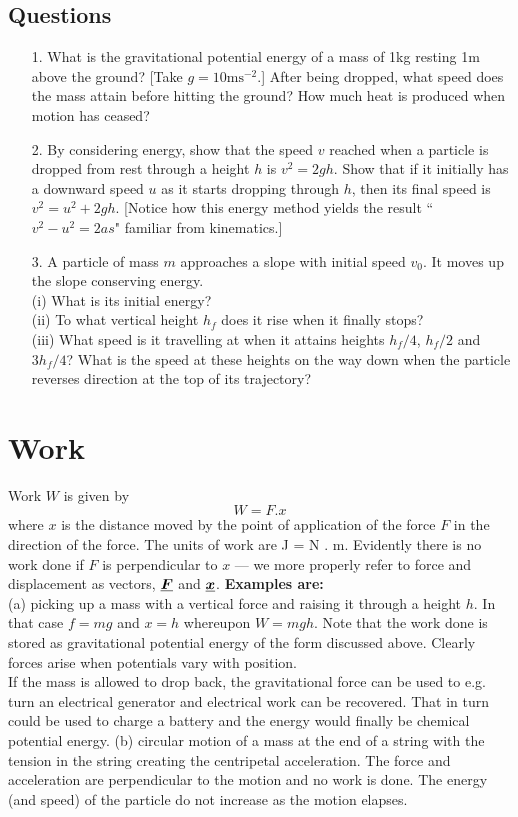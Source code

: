 \subsection*{Questions}
\begin{itemize}
\item[1.] What is the gravitational potential energy of a mass of 1kg resting 1m above the ground? [Take $g= 10\textrm{ms}^{-2}$.]  After being dropped, what speed does the mass attain before hitting the ground?  How much heat is produced when motion has ceased?
\item[2.] By considering energy, show that the speed $v$ reached when a particle is dropped from rest through a height $h$ is $v^2 = 2 g h$.  Show that if it initially has a downward speed $u$ as it starts dropping through $h$, then its final speed is $v^2 = u^2 + 2 gh$.  [Notice how this energy method yields the result ``$v^2 - u^2 = 2 as$" familiar from kinematics.]
\item[3.] A particle of mass $m$ approaches a slope with initial speed $v_0$.  It moves up the slope conserving energy.\\
 (i)  What is its initial energy?\\
(ii) To what vertical height $h_f$ does it rise when it finally stops?\\
(iii) What speed is it travelling at when it attains heights $h_f/4$, $h_f/2$ and $3h_f/4$?  What is the speed at these heights on the way down when the particle reverses direction at the top of its trajectory?
\end{itemize}
  \section{Work}
  Work $W$ is given by
\begin{equation*} 
W = {F}.{x}
\end{equation*}
where ${x}$ is the distance moved by the point of application of the force ${F}$ in the direction of the force.  The units of work are J = N . m. Evidently there is no work done if ${F}$ is perpendicular to ${x}$ --- we more properly refer to force and displacement as vectors, ${\mathit{\underline{\boldsymbol{F}}}}$ and ${\mathit{\underline{\boldsymbol{x}}}}$. \nll
{\bf Examples are:}\\
    (a) picking up a mass with a vertical force and raising it through a height $h$.  In that case $f = mg$ and $x = h$ whereupon $W = mg h$.  Note that the work done is stored as gravitational potential energy of the form discussed above.  Clearly forces arise when potentials vary with position.  \\ If the mass is allowed to drop back, the gravitational force can be used to e.g. turn an electrical generator and electrical work can be recovered.  That in turn could be used to charge a battery and the energy would finally be chemical potential energy.\nll
    (b) circular motion of a mass at the end of a string with the tension in the string creating the centripetal acceleration.  The force and acceleration are perpendicular to the motion and no work is done.  The energy (and speed) of the particle do not increase as the motion elapses.
